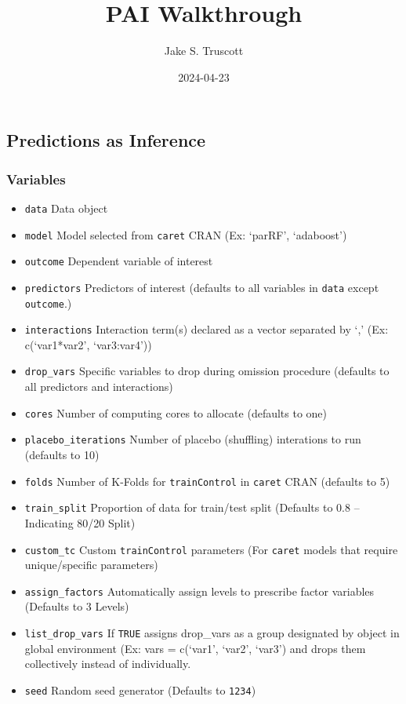 \documentclass[
]{article}
\title{PAI Walkthrough}
\author{Jake S. Truscott}
\date{2024-04-23}
\providecommand{\tightlist}{%
  \setlength{\itemsep}{0pt}\setlength{\parskip}{0pt}}
\begin{document}
\maketitle

\hypertarget{predictions-as-inference}{%
\subsection{\texorpdfstring{\textbf{Predictions as
Inference}}{Predictions as Inference}}\label{predictions-as-inference}}

\hypertarget{variables}{%
\subsubsection{\texorpdfstring{\textbf{Variables}}{Variables}}\label{variables}}

\begin{itemize}
\tightlist
\item
  \texttt{data} Data object
\item
  \texttt{model} Model selected from \texttt{caret} CRAN (Ex: `parRF',
  `adaboost')
\item
  \texttt{outcome} Dependent variable of interest
\item
  \texttt{predictors} Predictors of interest (defaults to all variables
  in \texttt{data} except \texttt{outcome}.)
\item
  \texttt{interactions} Interaction term(s) declared as a vector
  separated by `,' (Ex: c(`var1*var2', `var3:var4'))
\item
  \texttt{drop\_vars} Specific variables to drop during omission
  procedure (defaults to all predictors and interactions)
\item
  \texttt{cores} Number of computing cores to allocate (defaults to one)
\item
  \texttt{placebo\_iterations} Number of placebo (shuffling) interations
  to run (defaults to 10)
\item
  \texttt{folds} Number of K-Folds for \texttt{trainControl} in
  \texttt{caret} CRAN (defaults to 5)
\item
  \texttt{train\_split} Proportion of data for train/test split
  (Defaults to 0.8 -- Indicating 80/20 Split)
\item
  \texttt{custom\_tc} Custom \texttt{trainControl} parameters (For
  \texttt{caret} models that require unique/specific parameters)
\item
  \texttt{assign\_factors} Automatically assign levels to prescribe
  factor variables (Defaults to 3 Levels)
\item
  \texttt{list\_drop\_vars} If \texttt{TRUE} assigns drop\_vars as a
  group designated by object in global environment (Ex: vars = c(`var1',
  `var2', `var3') and drops them collectively instead of individually.
\item
  \texttt{seed} Random seed generator (Defaults to \texttt{1234})
\end{itemize}
\end{document}
